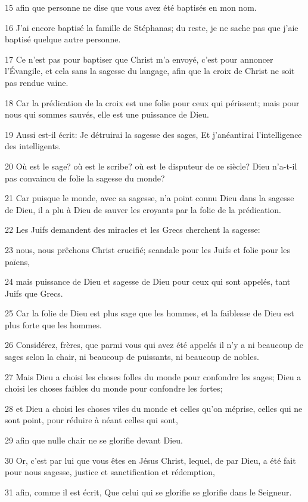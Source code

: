 \par 15 afin que personne ne dise que vous avez été baptisés en mon nom.
\par 16 J'ai encore baptisé la famille de Stéphanas; du reste, je ne sache pas que j'aie baptisé quelque autre personne.
\par 17 Ce n'est pas pour baptiser que Christ m'a envoyé, c'est pour annoncer l'Évangile, et cela sans la sagesse du langage, afin que la croix de Christ ne soit pas rendue vaine.
\par 18 Car la prédication de la croix est une folie pour ceux qui périssent; mais pour nous qui sommes sauvés, elle est une puissance de Dieu.
\par 19 Aussi est-il écrit: Je détruirai la sagesse des sages, Et j'anéantirai l'intelligence des intelligents.
\par 20 Où est le sage? où est le scribe? où est le disputeur de ce siècle? Dieu n'a-t-il pas convaincu de folie la sagesse du monde?
\par 21 Car puisque le monde, avec sa sagesse, n'a point connu Dieu dans la sagesse de Dieu, il a plu à Dieu de sauver les croyants par la folie de la prédication.
\par 22 Les Juifs demandent des miracles et les Grecs cherchent la sagesse:
\par 23 nous, nous prêchons Christ crucifié; scandale pour les Juifs et folie pour les païens,
\par 24 mais puissance de Dieu et sagesse de Dieu pour ceux qui sont appelés, tant Juifs que Grecs.
\par 25 Car la folie de Dieu est plus sage que les hommes, et la faiblesse de Dieu est plus forte que les hommes.
\par 26 Considérez, frères, que parmi vous qui avez été appelés il n'y a ni beaucoup de sages selon la chair, ni beaucoup de puissants, ni beaucoup de nobles.
\par 27 Mais Dieu a choisi les choses folles du monde pour confondre les sages; Dieu a choisi les choses faibles du monde pour confondre les fortes;
\par 28 et Dieu a choisi les choses viles du monde et celles qu'on méprise, celles qui ne sont point, pour réduire à néant celles qui sont,
\par 29 afin que nulle chair ne se glorifie devant Dieu.
\par 30 Or, c'est par lui que vous êtes en Jésus Christ, lequel, de par Dieu, a été fait pour nous sagesse, justice et sanctification et rédemption,
\par 31 afin, comme il est écrit, Que celui qui se glorifie se glorifie dans le Seigneur.

